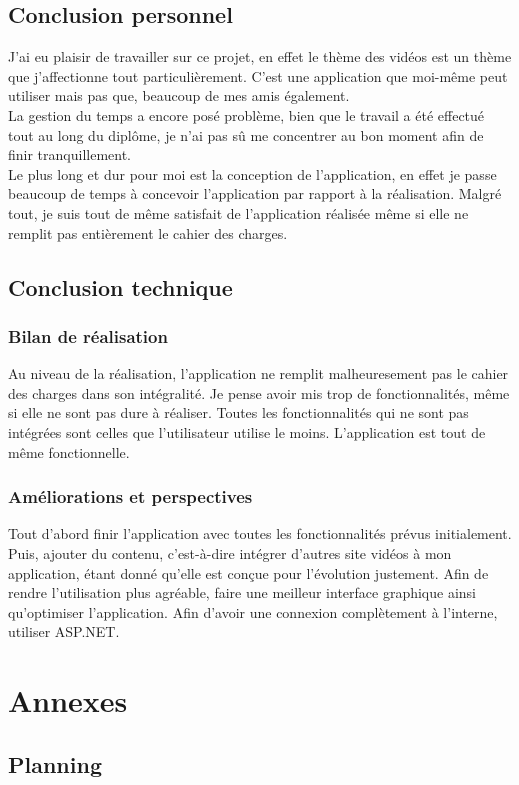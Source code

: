 \documentclass[11pt]{report} %
\begin{document}
\section{Conclusion personnel}
	J'ai eu plaisir de travailler sur ce projet, en effet le thème des vidéos est un thème que j'affectionne tout particulièrement. C'est une application que moi-même peut utiliser mais pas que, beaucoup de mes amis également.\\
	La gestion du temps a encore posé problème, bien que le travail a été effectué tout au long du diplôme, je n'ai pas sû me concentrer au bon moment afin de finir tranquillement.\\ 
	Le plus long et dur pour moi est la conception de l'application, en effet je passe beaucoup de temps à concevoir l'application par rapport à la réalisation.
	Malgré tout, je suis tout de même satisfait de l'application réalisée même si elle ne remplit pas entièrement le cahier des charges.
	
\section{Conclusion technique}
\subsection{Bilan de réalisation}
	Au niveau de la réalisation, l'application ne remplit malheuresement pas le cahier des charges dans son intégralité. Je pense avoir mis trop de fonctionnalités, même si elle ne sont pas dure à réaliser. Toutes les fonctionnalités qui ne sont pas intégrées sont celles que l'utilisateur utilise le moins.
	L'application est tout de même fonctionnelle.
\subsection{Améliorations et perspectives}
	Tout d'abord finir l'application avec toutes les fonctionnalités prévus initialement.
	Puis, ajouter du contenu, c'est-à-dire intégrer d'autres site vidéos à mon application, étant donné qu'elle est conçue pour l'évolution justement.
	Afin de rendre l'utilisation plus agréable, faire une meilleur interface graphique ainsi qu'optimiser l'application.
	Afin d'avoir une connexion complètement à l'interne, utiliser ASP.NET.

\chapter{Annexes}
	\section{Planning}
\end{document}
